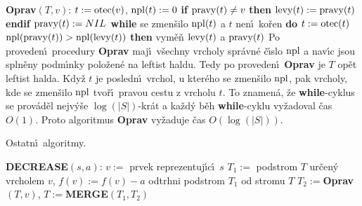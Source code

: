 {\bf Oprav$(T,v)$}:\newline 
$t:=\operatorname{otec}(v)$, $\operatorname{npl}(t):=0$\newline 
{\bf if} $\operatorname{pravy}(t)\ne v$ {\bf then} $\operatorname{levy}(t):=\operatorname{pravy}(t)$ {\bf endif\newline 
$\operatorname{pravy}(t):=NIL$\newline 
while} se zmen\v silo $\operatorname{npl}(t)$ a $t$ nen\'\i\ ko\v ren {\bf do}\newline 
\phantom{---}$t:=\operatorname{otec}(t)$\newline
\phantom{---}{\bf if} $\operatorname{npl}(\operatorname{pravy}(t))>\operatorname{npl}(\operatorname{levy}(t))$ {\bf then}\newline 
\phantom{------}vym\v e\v n $\operatorname{levy}(t)$ a $\operatorname{pravy}(t)$\newline 
{}\flushpar Po proveden\'\i\ procedury {\bf Oprav} maj\'\i\ v\v sechny vrcholy 
spr\'avn\'e \v c\'\i slo $\operatorname{npl}$ a nav\'\i c jsou spln\v eny podm\'\i nky polo\v zen\'e na 
leftist haldu.  Tedy po proveden\'\i\ {\bf Oprav} je $T$ op\v et 
leftist halda.  Kdy\v z $t$ je posledn\'\i\ vrchol, u kter\'eho se zmen\v silo 
$\operatorname{npl}$, pak vrcholy, kde se zmen\v silo $\operatorname{npl}$ tvo\v r\'\i\ pravou cestu z 
vrcholu $t$.  To znamen\'a, \v ze {\bf while}-cyklus se prov\'ad\v el nejv\'y\v se 
$\log(|S|)$-kr\'at a ka\v zd\'y b\v eh {\bf while}-cyklu vy\v zadoval \v cas $
O(1)$.  
Proto  
algoritmus {\bf Oprav} vy\v zaduje \v cas $O(\log(|S|))$.  
\medskip

\subhead
Ostatn\'\i\ algoritmy.
\endsubhead
\bigskip

{\bf DECREASE$(s,a)$}:\newline
$v:=$ prvek reprezentuj\'\i c\'\i\ $s$\newline 
$T_1:=$ podstrom $T$ ur\v cen\'y vrcholem $v$, $f(v):=f(v)-a$\newline 
odtrhni podstrom $T_1$ od stromu $T$\newline 
$T_2:=${\bf Oprav$(T,v)$}, $T:=${\bf MERGE$(T_1,T_2)$}
\bigskip

